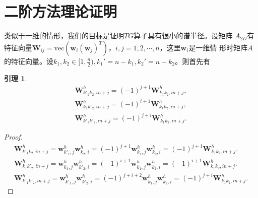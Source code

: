 \documentclass[a4paper,twoside]{ctexart}
\newtheorem{lemma}[definition]{引理}
\begin{document}
\section{二阶方法理论证明}
类似于一维的情形，我们的目标是证明$TG$算子具有很小的谱半径。设矩阵
$A_{2D}$有特征向量$\mathbf{W}_{ij} =
\text{vec}(\mathbf{w}_i(\mathbf{w}_j)^T)$，$i,j = 1,2,\cdots,n$，这里$\mathbf{w}_i$是一维情
形时矩阵$A$的特征向量。设$k_1,k_2\in [1,\frac{n}{2}), k_1' = n - k_1 ,
k_2' = n - k_2$。则首先有
\begin{lemma}
  \label{le:1}
  \begin{eqnarray}
\mathbf{W}^h_{k'_1 k_2,in+j} = (-1)^{j+1}\mathbf{W}^h_{k_1
  k_2,in+j},\\
\mathbf{W}^h_{k_1 k'_2,in+j} = (-1)^{i+1}\mathbf{W}^h_{k_1
  k_2,in+j},\\
\mathbf{W}^h_{k'_1 k'_2,in+j} = (-1)^{j+i}\mathbf{W}^h_{k_1
    k_2,in+j}.
     \end{eqnarray}
\end{lemma}
\begin{proof}
  \begin{eqnarray}
    \mathbf{W}^h_{k'_1 k_2,in+j} =
    \mathbf{w}^h_{k'_1,j}\mathbf{w}^h_{k_2,i} =
    (-1)^{j+1}\mathbf{w}^h_{k_1,j}\mathbf{w}^h_{k_2,i} = (-1)^{j+1}\mathbf{W}^h_{k_1
    k_2,in+j}.\\
    \mathbf{W}^h_{k_1 k'_2,in+j} =
    \mathbf{w}^h_{k_1,j}\mathbf{w}^h_{k'_2,i}=(-1)^{i+1}\mathbf{w}^h_{k_1,j}\mathbf{w}^h_{k_2,i}
    = (-1)^{i+1}\mathbf{W}^h_{k_1
    k_2,in+j}.\\
    \mathbf{W}^h_{k'_1 k'_2,in+j} = \mathbf{w}^h_{k'_1,j}\mathbf{w}^h_{k'_2,i}=(-1)^{j+i+2}\mathbf{w}^h_{k_1,j}\mathbf{w}^h_{k_2,i}
    = (-1)^{j+i}\mathbf{W}^h_{k_1
    k_2,in+j}.
  \end{eqnarray}
\end{proof}
\end{document}
